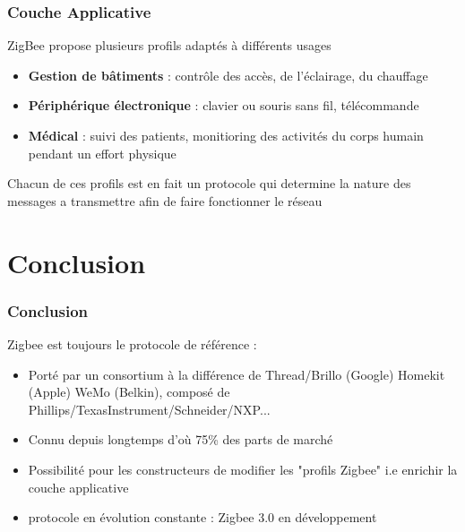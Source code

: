 \documentclass{beamer}
\begin{document}
  \begin{frame}
   \frametitle{Couche Applicative}
   \begin{block}{ZigBee propose plusieurs profils adaptés à différents usages}
     \begin{itemize}
      \item \textbf{Gestion de bâtiments} : contrôle des accès, de l'éclairage, du chauffage
      \item \textbf{Périphérique électronique} : clavier ou souris sans fil, télécommande
      \item \textbf{Médical} : suivi des patients, monitioring des activités du corps humain pendant un effort physique
     \end{itemize}
     
     Chacun de ces profils est en fait un protocole qui determine la nature des messages a transmettre afin de faire fonctionner le réseau

   \end{block}

  \end{frame}


  \section{Conclusion}

  \begin{frame}
    \frametitle{Conclusion}
    \begin{block}{Zigbee est toujours le protocole de référence :}
      \begin{itemize}
	\item Porté par un consortium à la différence de Thread/Brillo (Google) Homekit (Apple) WeMo (Belkin), composé de Phillips/TexasInstrument/Schneider/NXP...
	\item Connu depuis longtemps d'où 75\% des parts de marché
	\item Possibilité pour les constructeurs de modifier les "profils Zigbee" i.e enrichir la couche applicative
	\item protocole en évolution constante : Zigbee 3.0 en développement
      \end{itemize}  
    \end{block}
  \end{frame}
  
\end{document}
